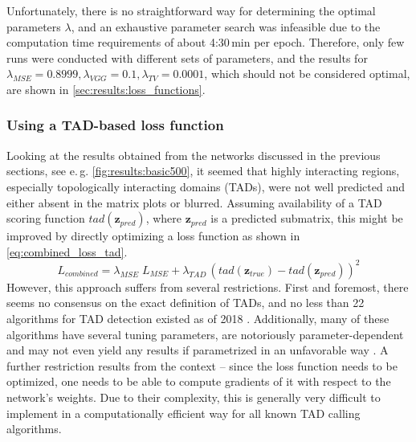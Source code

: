 Unfortunately, there is no straightforward way for determining the optimal parameters $\lambda$,
and an exhaustive parameter search was infeasible due to the computation time requirements of about 4:30\,min per epoch.
Therefore, only few runs were conducted with different sets of parameters,
and the results for $\lambda_\mathit{MSE} = 0.8999, \lambda_\mathit{VGG}=0.1, \lambda_\mathit{TV}=0.0001$,
which should not be considered optimal, are shown in \cref{sec:results:loss_functions}.

\subsubsection{Using a TAD-based loss function} \label{sec:improve:TAD_loss}
Looking at the results obtained from the networks discussed in the previous sections, see e.\,g. \cref{fig:results:basic500}, 
it seemed that highly interacting regions, especially topologically interacting domains (TADs), were not well predicted and either absent
in the matrix plots or blurred.
Assuming availability of a TAD scoring function $\mathit{tad}(\mathbf{z}_\mathit{pred})$, where $\mathbf{z}_\mathit{pred}$ is a predicted submatrix,
this might be improved by directly optimizing a loss function as shown in \cref{eq:combined_loss_tad}.
\begin{equation}
 L_\mathit{combined} = \lambda_\mathit{MSE}\;L_\mathit{MSE} + \lambda_\mathit{TAD} \, (\mathit{tad}(\mathbf{z}_\mathit{true}) - \mathit{tad}(\mathbf{z}_\mathit{pred}))^2 \label{eq:combined_loss_tad}
\end{equation}
However, this approach suffers from several restrictions.
First and foremost, there seems no consensus on the exact definition of TADs, 
and no less than 22 algorithms for TAD detection existed as of 2018 \cite{Dali2017,Zufferey2018}.
Additionally, many of these algorithms have several tuning parameters, are notoriously parameter-dependent
and may not even yield any results if parametrized in an unfavorable way \cite{Zufferey2018}. 
A further restriction results from the context -- since the loss function needs to be optimized,
one needs to be able to compute gradients of it with respect to the network's weights.
Due to their complexity, this is generally very difficult to implement in a computationally efficient way for all known TAD calling algorithms.

